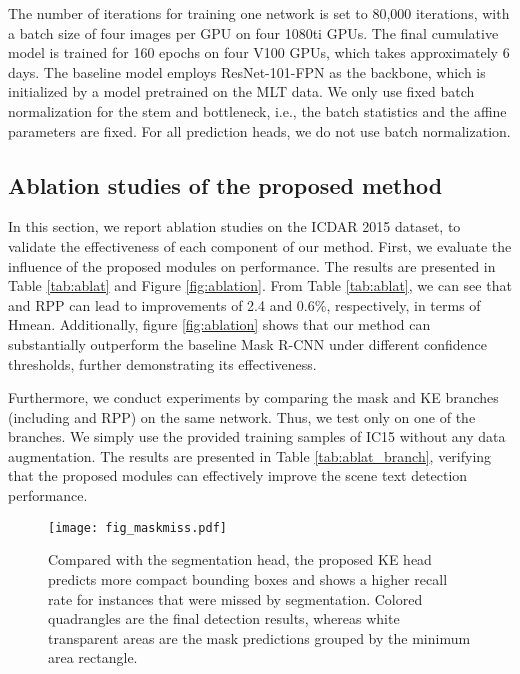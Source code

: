 The number of iterations for training one network is set to
80,000 iterations, with a batch size of four images per GPU on four 1080ti GPUs. The final cumulative model is
trained for 
160 epochs on four V100 GPUs, which takes
approximately 6 days. The baseline model employs
ResNet-101-FPN as the backbone, which is
initialized by a model pretrained on the MLT \cite{nayef2017icdar2017} data. We only use
fixed batch normalization for the stem and bottleneck,  i.e., the batch statistics and the affine parameters are fixed. For all prediction heads, we do
not use batch normalization. 





\subsection{Ablation studies of the proposed method}
In this section, we report ablation studies on the ICDAR 2015 \cite{karatzas2015icdar} dataset,
to validate the effectiveness of each component of our method. 
First, we evaluate
the influence of the proposed modules on performance. The results are presented in Table \ref{tab:ablat} and Figure \ref{fig:ablation}. From Table \ref{tab:ablat}, we can see that \Ours and RPP can lead to improvements of 2.4 and 0.6\%, respectively, in terms of Hmean. Additionally, figure \ref{fig:ablation} shows that our method can substantially outperform the baseline Mask R-CNN under different confidence thresholds, further demonstrating its effectiveness. 


Furthermore, we conduct experiments by comparing the mask and KE branches (including \Ours and RPP) on the same network. Thus, we test only on one of the branches. We simply use the provided training samples of IC15 without any data augmentation. The results are presented in Table \ref{tab:ablat_branch}, verifying that the proposed modules can effectively improve the scene text detection performance. 

\begin{figure}[t!]
	\centering
	\texttt{[image: fig\_maskmiss.pdf]} 
	\caption{Compared with the segmentation head, the proposed KE head predicts more compact bounding boxes and shows a higher recall rate for instances that were missed by segmentation. Colored quadrangles are the final detection results, whereas white transparent areas are the mask predictions grouped by the minimum area rectangle.}
	\label{fig:bdn_Ablation }
\end{figure}



